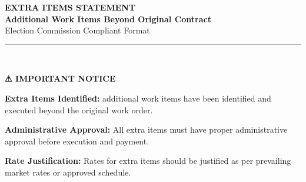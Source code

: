 \documentclass[12pt,a4paper]{article}
\begin{document}
\begin{center}
    {\Huge\textbf{\textcolor{headerred}{EXTRA ITEMS STATEMENT}}}\\[0.8cm]
    {\Large\textbf{Additional Work Items Beyond Original Contract}}\\[0.5cm]
    {\large Election Commission Compliant Format}\\[0.3cm]
    \rule{\textwidth}{2pt}\\[1cm]
\end{center}

\begin{center}
\end{center}

\vspace{1cm}


\begin{center}
\colorbox{warningamber!20}{\begin{minipage}{0.9\textwidth}
\begin{center}
\textcolor{headerred}{\textbf{⚠ IMPORTANT NOTICE}}
\end{center}
\vspace{0.3cm}
\textbf{Extra Items Identified:}  additional work items have been identified and executed beyond the original work order.

\textbf{Administrative Approval:} All extra items must have proper administrative approval before execution and payment.

\textbf{Rate Justification:} Rates for extra items should be justified as per prevailing market rates or approved schedule.
\end{minipage}}
\end{center}
\end{document}

